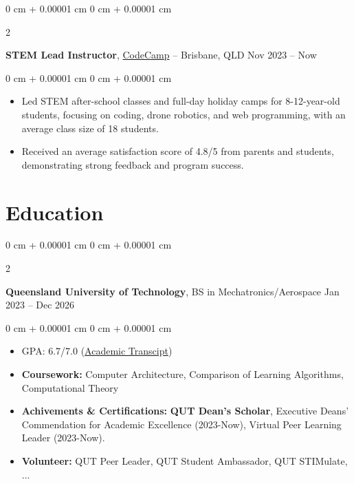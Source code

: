 \documentclass[10pt, letterpaper]{article}
\newenvironment{highlights}{
    \begin{itemize}[
        topsep=0.10 cm,
        parsep=0.10 cm,
        partopsep=0pt,
        itemsep=0pt,
        leftmargin=0 cm + 10pt
    ]
}{
    \end{itemize}
} %
\newenvironment{onecolentry}{
    \begin{adjustwidth}{
        0 cm + 0.00001 cm
    }{
        0 cm + 0.00001 cm
    }
}{
    \end{adjustwidth}
} %
\newenvironment{twocolentry}[2][]{
    \onecolentry
    \def\secondColumn{#2}
    \setcolumnwidth{\fill, 4.5 cm}
    \begin{paracol}{2}
}{
    \switchcolumn \raggedleft \secondColumn
    \end{paracol}
    \endonecolentry
} %
\begin{document}
\vspace{0.4 cm}

\begin{twocolentry}{
            Nov 2023 – Now
      }
      \textbf{STEM Lead Instructor}, \href{https://www.codecamp.com.au/}{CodeCamp} -- Brisbane, QLD\end{twocolentry}

\vspace{0.10 cm}
\begin{onecolentry}
      \begin{highlights}
            \item Led STEM after-school classes and full-day holiday camps for 
            8-12-year-old students, focusing on coding, drone robotics, 
            and web programming, with an average class size of 18 students.
            \item Received an average satisfaction score of 4.8/5 from parents and students, 
            demonstrating strong feedback and program success.

      \end{highlights}
\end{onecolentry}

\section{Education}

\begin{twocolentry}{
            Jan 2023 – Dec 2026
      }
      \textbf{Queensland University of Technology}, BS in Mechatronics/Aerospace\end{twocolentry}

\vspace{0.10 cm}
\begin{onecolentry}
      \begin{highlights}
            \item GPA: 6.7/7.0 (\href{https://sites.google.com/view/kelvincv/academic-transcript?authuser=0}{Academic Transcipt})
            \item \textbf{Coursework:} Computer Architecture, Comparison of Learning Algorithms, Computational Theory
            \item \textbf{Achivements \& Certifications:} \textbf{QUT Dean's Scholar},
            Executive Deans' Commendation for Academic Excellence (2023-Now),
            Virtual Peer Learning Leader (2023-Now).
            \item \textbf{Volunteer:} QUT Peer Leader, QUT Student Ambassador, QUT STIMulate, ...

      \end{highlights}
\end{onecolentry}
\end{document}
